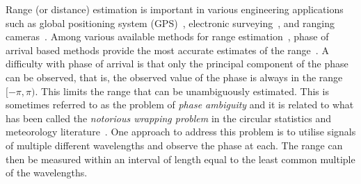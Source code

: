 Range (or distance) estimation is important in various engineering applications such as global positioning system (GPS)~\cite{Teunissen_GPS_LAMBDA_2006,Teunissen_GPS_1995}, electronic surveying~\cite{Jacobs_ambiguity_resolution_interferometery_1981, anderson1998surveying}, and ranging cameras~\cite{time_of_flight_cam_continuous_wave_2009,Arrigo_patent_2014}. Among various available methods for range estimation~\cite{Chitte_RSS_Estimation2009, HingCheung_RSSbasedRangeEstimation2012, XinrongLi_TOA_range_estimation2004, Lanzisera_TOA_range_estimation2011}, phase of arrival based methods provide the most accurate estimates of the range~\cite{Fauzia_POA_range_estimation2007, Povalac_POA_rangeestimation2011}. 
A difficulty with phase of arrival is that only the principal component of the phase can be observed, that is, the observed value of the phase is always in the range $[-\pi, \pi)$.  This limits the range that can be unambiguously estimated.  This is sometimes referred to as the problem of \emph{phase ambiguity} and it is related to what has been called the \emph{notorious wrapping problem} in the circular statistics and meteorology literature~\cite{Fisher1993}.  One approach to address this problem is to utilise signals of multiple different wavelengths and observe the phase at each.  The range can then be measured within an interval of length equal to the least common multiple of the wavelengths.  

